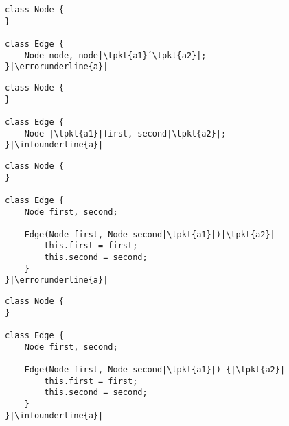 \newcommand{\featuremodule}[1]{\hfill#1~~~}

\lstset{style=java,tabsize=2,escapechar=|,frame=none,style=small,backgroundcolor=}%
\newcommand{\centeredlisting}[1]{
	\begin{center}
		\begin{tikzpicture}[every node/.style={rounded corners,draw,thick,fill=white},listing/.style={inner xsep=4pt,inner ysep=3pt}]
			\node[listing] at (0,0) {\makebox{\usebox{#1}}};
		\end{tikzpicture}
	\end{center}
}


\newsavebox{\edgelexicalerror}
\begin{lrbox}{\edgelexicalerror}
	\begin{lstlisting}
class Node {
}

class Edge {
	Node node, node|\tpkt{a1}´\tpkt{a2}|;
}|\errorunderline{a}|
	\end{lstlisting}
\end{lrbox}

\newsavebox{\edgelexicalerrorfix}
\begin{lrbox}{\edgelexicalerrorfix}
	\begin{lstlisting}
class Node {
}

class Edge {
	Node |\tpkt{a1}|first, second|\tpkt{a2}|;
}|\infounderline{a}|
	\end{lstlisting}
\end{lrbox}

\newsavebox{\edgesyntaxerror}
\begin{lrbox}{\edgesyntaxerror}
	\begin{lstlisting}
class Node {
}

class Edge {
	Node first, second;

	Edge(Node first, Node second|\tpkt{a1}|)|\tpkt{a2}|
		this.first = first;
		this.second = second;
	}
}|\errorunderline{a}|
	\end{lstlisting}
\end{lrbox}

\newsavebox{\edgesyntaxerrorfix}
\begin{lrbox}{\edgesyntaxerrorfix}
	\begin{lstlisting}
class Node {
}

class Edge {
	Node first, second;

	Edge(Node first, Node second|\tpkt{a1}|) {|\tpkt{a2}|
		this.first = first;
		this.second = second;
	}
}|\infounderline{a}|
	\end{lstlisting}
\end{lrbox}

